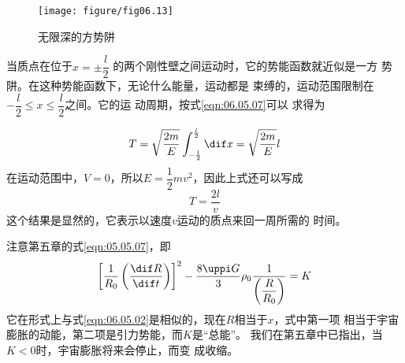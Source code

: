 \documentclass[../outline-of-mechanics.tex]{subfiles}
\begin{document}
\begin{wrapfigure}[9]{r}{15em}
  \vspace{-2em}
  \centering
  \texttt{[image: figure/fig06.13]}
  \caption{无限深的方势阱}
  \label{fig:06.13}
\end{wrapfigure}
当质点在位于$ x = \pm \dfrac { l } { 2 } $
的两个刚性壁之间运动时，它的势能函数就近似是一方
势阱。在这种势能函数下，无论什么能量，运动都是
束缚的，运动范围限制在
$ - \dfrac { l } { 2 } \leqslant x \leqslant \dfrac { l } { 2 } $之间。它的运
动周期，按式\eqref{eqn:06.05.07}可以
求得为

\begin{equation*}
  T = \sqrt { \frac { 2 m } { E } } \int _ { - \frac { l } { 2 } } ^ { \frac { l } { 2 } } \dif x = \sqrt { \frac { 2 m } { E } } l
\end{equation*}
在运动范围中，$ V = 0 $，所以$ E = \dfrac { 1 } { 2 } m v ^ { 2 } $，因此上式还可以写成
\begin{equation*}
  T = \frac { 2 l } { v }
\end{equation*}
这个结果是显然的，它表示以速度$ v $运动的质点来回一周所需的
时间。

\clearpage
\example 注意第五章的式\eqref{eqn:05.05.07}，即
\begin{equation}\label{eqn:06.05.08}
  \left[ \frac { 1 } { R _ { 0 } } \left( \frac { \dif R } { \dif t } \right) \right] ^ { 2 }- \frac { 8 \uppi G } { 3 } \rho _ 0 \frac { 1 } { \left( \dfrac { R } { R _ { 0 } } \right) } = K
\end{equation}
它在形式上与式\eqref{eqn:06.05.02}是相似的，现在$ R $相当于$ x $，式中第一项
相当于宇宙膨胀的动能，第二项是引力势能，而$ K $是“总能”。
我们在第五章中已指出，当$ K < 0 $时，宇宙膨胀将来会停止，而变
成收缩。
\end{document}
